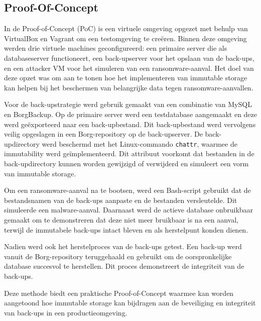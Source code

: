 \subsection{Proof-Of-Concept}
In de Proof-of-Concept (PoC) is een virtuele omgeving opgezet met behulp van VirtualBox en Vagrant om een testomgeving te creëren. Binnen deze omgeving werden drie virtuele machines geconfigureerd: een primaire server die als databaseserver functioneert, een back-upserver voor het opslaan van de back-ups, en een attacker VM voor het simuleren van een ransomware-aanval. Het doel van deze opzet was om aan te tonen hoe het implementeren van immutable storage kan helpen bij het beschermen van belangrijke data tegen ransomware-aanvallen.

Voor de back-upstrategie werd gebruik gemaakt van een combinatie van MySQL en BorgBackup. Op de primaire server werd een testdatabase aangemaakt en deze werd geëxporteerd naar een back-upbestand. Dit back-upbestand werd vervolgens veilig opgeslagen in een Borg-repository op de back-upserver. De back-updirectory werd beschermd met het Linux-commando \texttt{chattr}, waarmee de immutability werd geïmplementeerd. Dit attribuut voorkomt dat bestanden in de back-updirectory kunnen worden gewijzigd of verwijderd en simuleert een vorm van immutable storage.

Om een ransomware-aanval na te bootsen, werd een Bash-script gebruikt dat de bestandsnamen van de back-ups aanpaste en de bestanden versleutelde. Dit simuleerde een malware-aanval. Daarnaast werd de actieve database onbruikbaar gemaakt om te demonstreren dat deze niet meer bruikbaar is na een aanval, terwijl de immutabele back-ups intact bleven en als herstelpunt konden dienen.

Nadien werd ook het herstelproces van de back-ups getest. Een back-up werd vanuit de Borg-repository teruggehaald en gebruikt om de oorspronkelijke database succesvol te herstellen. Dit proces demonstreert de integriteit van de back-ups.

Deze methode biedt een praktische Proof-of-Concept waarmee kan worden aangetoond hoe immutable storage kan bijdragen aan de beveiliging en integriteit van back-ups in een productieomgeving.